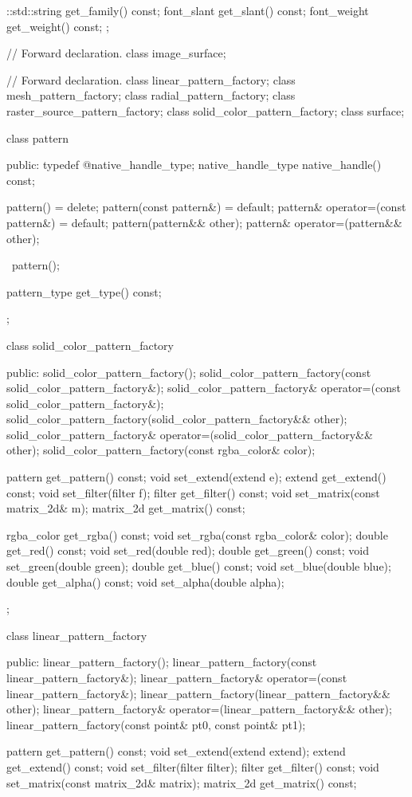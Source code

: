 \begin{codeblock}
{{{{{    ::std::string get_family() const;
    font_slant get_slant() const;
    font_weight get_weight() const;
  };

  // Forward declaration.
  class image_surface;

  // Forward declaration.
  class linear_pattern_factory;
  class mesh_pattern_factory;
  class radial_pattern_factory;
  class raster_source_pattern_factory;
  class solid_color_pattern_factory;
  class surface;

  class pattern {
  public:
    typedef @\impdef@ native_handle_type;
    native_handle_type native_handle() const;

    pattern() = delete;
    pattern(const pattern&) = default;
    pattern& operator=(const pattern&) = default;
    pattern(pattern&& other);
    pattern& operator=(pattern&& other);

    ~pattern();

    pattern_type get_type() const;
  };

  class solid_color_pattern_factory {
  public:
    solid_color_pattern_factory();
    solid_color_pattern_factory(const solid_color_pattern_factory&);
    solid_color_pattern_factory& operator=(const solid_color_pattern_factory&);
    solid_color_pattern_factory(solid_color_pattern_factory&& other);
    solid_color_pattern_factory& operator=(solid_color_pattern_factory&& other);
    solid_color_pattern_factory(const rgba_color& color);

    pattern get_pattern() const;
    void set_extend(extend e);
    extend get_extend() const;
    void set_filter(filter f);
    filter get_filter() const;
    void set_matrix(const matrix_2d& m);
    matrix_2d get_matrix() const;

    rgba_color get_rgba() const;
    void set_rgba(const rgba_color& color);
    double get_red() const;
    void set_red(double red);
    double get_green() const;
    void set_green(double green);
    double get_blue() const;
    void set_blue(double blue);
    double get_alpha() const;
    void set_alpha(double alpha);
  };

  class linear_pattern_factory {
  public:
    linear_pattern_factory();
    linear_pattern_factory(const linear_pattern_factory&);
    linear_pattern_factory& operator=(const linear_pattern_factory&);
    linear_pattern_factory(linear_pattern_factory&& other);
    linear_pattern_factory& operator=(linear_pattern_factory&& other);
    linear_pattern_factory(const point& pt0, const point& pt1);

    pattern get_pattern() const;
    void set_extend(extend extend);
    extend get_extend() const;
    void set_filter(filter filter);
    filter get_filter() const;
    void set_matrix(const matrix_2d& matrix);
    matrix_2d get_matrix() const;

}}}}}
\end{codeblock}
